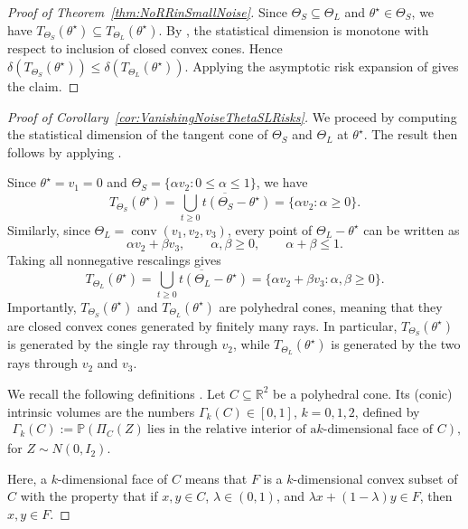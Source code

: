 \documentclass[11pt]{article}
\theoremstyle{plain}
\theoremstyle{definition}
\providecommand{\mathbbm}{\mathbb} %
\newcommand{\R}{\mathbbm{R}}
\begin{document}
\begin{proof}[Proof of Theorem~\ref{thm:NoRRinSmallNoise}]
Since $\Theta_S\subseteq\Theta_L$ and $\theta^\star\in\Theta_S$, we have $T_{\Theta_S}(\theta^\star)\subseteq T_{\Theta_L}(\theta^\star)$. By \cite[Proposition~3.1]{amelunxen2014living}, the statistical dimension is
monotone with respect to inclusion of closed convex cones. Hence $\delta(T_{\Theta_S}(\theta^\star)) \le \delta(T_{\Theta_L}(\theta^\star))$. Applying the asymptotic risk expansion of
\cite[Theorem~3.1]{oymak2016sharp} gives the claim.
\end{proof}



\begin{proof}[Proof of Corollary~\ref{cor:VanishingNoiseThetaSLRisks}]

We proceed by computing the statistical dimension of the tangent cone of
$\Theta_S$ and $\Theta_L$ at $\theta^\star$. The result then follows by
applying \cite[Theorem 3.1]{oymak2016sharp}.


Since $\theta^\star=v_1=0$ and $\Theta_S=\{\alpha v_2:0\le \alpha\le1\}$, we have 
\[ 
 T_{\Theta_S}(\theta^\star) = 
 \overline{\bigcup_{t\ge0}t(\Theta_S-\theta^\star)}
 = \{\alpha v_2:\alpha\ge0\}. \] 
Similarly, since $\Theta_L = \operatorname{conv}(v_1,v_2,v_3)$, every point of $\Theta_L-\theta^\star$ can be written as 
\[ 
\alpha v_2+\beta v_3, \qquad \alpha,\beta\ge0,\qquad \alpha+\beta\le1. 
\] 
Taking all nonnegative rescalings gives 
\[ 
T_{\Theta_L}(\theta^\star)
= \overline{\bigcup_{t\ge0}t(\Theta_L-\theta^\star)}=\{\alpha v_2+\beta v_3:\alpha,\beta\ge 0\}. 
\]
Importantly, $T_{\Theta_S}(\theta^\star)$ and
$T_{\Theta_L}(\theta^\star)$ are polyhedral cones, meaning that they are closed convex
cones generated by finitely many rays. In particular,
$T_{\Theta_S}(\theta^\star)$ is generated by the single ray through $v_2$,
while $T_{\Theta_L}(\theta^\star)$ is generated by the two rays through
$v_2$ and $v_3$.


We recall the following definitions \cite[Section 5.1]{amelunxen2014living}.
Let $C \subseteq \R^2$ be a polyhedral cone. Its (conic) intrinsic volumes are the
numbers $\Gamma_k(C)\in[0,1]$, $k=0,1,2$, defined by 
\begin{align*}
\Gamma_k(C)
:=
\mathbb{P}(\Pi_C(Z)\ \text{lies in the relative interior of a
$k$-dimensional face of $C$}),
\end{align*}
for $Z\sim N(0,I_2)$. 


Here, a $k$-dimensional face of $C$ means that $F$ is a $k$-dimensional convex subset of $C$ with the property that if $x,y\in C$, $\lambda\in(0,1)$,
and $\lambda x+(1-\lambda)y\in F$, then $x,y\in F$.




\end{proof}
\end{document}
